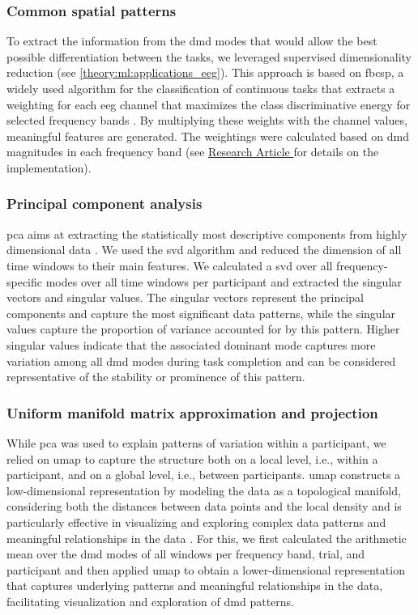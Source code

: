 \subsubsection{Common spatial patterns}
To extract the information from the \gls{dmd} modes that would allow the best possible differentiation between the tasks, we leveraged supervised dimensionality reduction (see \autoref{theory:ml:applications_eeg}). This approach is based on \gls{fbcsp}, a widely used algorithm for the classification of continuous tasks that extracts a weighting for each \gls{eeg} channel that maximizes the class discriminative energy for selected frequency bands \cite{ang2012filter}. By multiplying these weights with the channel values, meaningful features are generated. The weightings were calculated based on \gls{dmd} magnitudes in each frequency band (see \hyperref[paperI]{Research Article } \cite{Goelz2021a} for details on the implementation).

\subsubsection{Principal component analysis}
\Gls{pca} aims at extracting the statistically most descriptive components from highly dimensional data \cite{Brunton_kutz_2019}. We used the \gls{svd} algorithm and reduced the dimension of all time windows to their main features. We calculated a \gls{svd} over all frequency-specific modes over all time windows per participant and extracted the singular vectors and singular values. The singular vectors represent the principal components and capture the most significant data patterns, while the singular values capture the proportion of variance accounted for by this pattern. Higher singular values indicate that the associated dominant mode captures more variation among all \gls{dmd} modes during task completion and can be considered representative of the stability or prominence of this pattern.

\subsubsection{Uniform manifold matrix approximation and projection}
While \gls{pca} was used to explain patterns of variation within a participant, we relied on \gls{umap} to capture the structure both on a local level, i.e., within a participant, and on a global level, i.e., between participants. \Gls{umap} constructs a low-dimensional representation by modeling the data as a topological manifold, considering both the distances between data points and the local density and is particularly effective in visualizing and exploring complex data patterns and meaningful relationships in the data \cite{mcinnes2018umap}. For this, we first calculated the arithmetic mean over the \gls{dmd} modes of all windows per frequency band, trial, and participant and then applied \gls{umap} to obtain a lower-dimensional representation that captures underlying patterns and meaningful relationships in the data, facilitating visualization and exploration of \gls{dmd} patterns.

